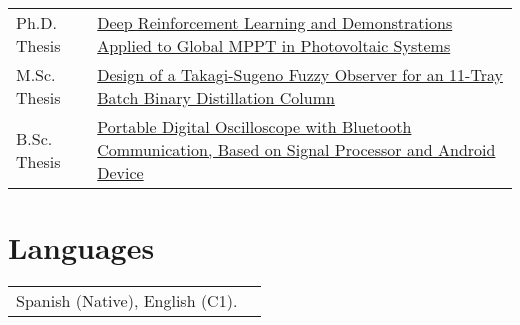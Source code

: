 \documentclass[a4paper,10pt]{article}
\begin{document}
\begin{tabularx}{\linewidth}{@{}l X@{}}		
Ph.D. Thesis & \href{https://balcortex.github.io/assets/thesis/thesis_phd.pdf}{Deep Reinforcement Learning and Demonstrations Applied to Global MPPT in Photovoltaic Systems} \hfill \\
M.Sc. Thesis & \href{https://balcortex.github.io/assets/thesis/thesis_masters.pdf}{Design of a Takagi-Sugeno Fuzzy Observer for an 11-Tray Batch Binary Distillation Column} \hfill \\
B.Sc. Thesis & \href{https://balcortex.github.io/assets/thesis/thesis_bachelors.pdf}{Portable Digital Oscilloscope with Bluetooth Communication, Based on Signal Processor and Android Device} \hfill \\
\end{tabularx}


\section{Languages}
\begin{tabularx}{\linewidth}{@{}l X@{}}
Spanish (Native), English (C1).\\  
\end{tabularx}



\end{document}
